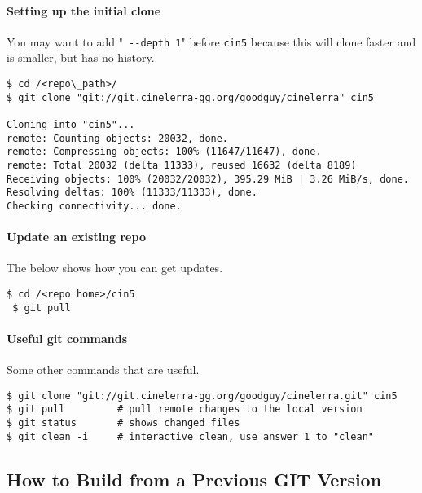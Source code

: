 \paragraph{Setting up the initial clone}%
\label{par:setting_up_the_initial_clone}

You may want to add "\texttt{ -{}-depth 1}" before \texttt{cin5} because this will clone faster and is smaller, but has no history.

\begin{lstlisting}[numbers=none]
$ cd /<repo\_path>/
$ git clone "git://git.cinelerra-gg.org/goodguy/cinelerra" cin5

Cloning into "cin5"...
remote: Counting objects: 20032, done.
remote: Compressing objects: 100% (11647/11647), done.
remote: Total 20032 (delta 11333), reused 16632 (delta 8189)
Receiving objects: 100% (20032/20032), 395.29 MiB | 3.26 MiB/s, done.
Resolving deltas: 100% (11333/11333), done.
Checking connectivity... done.
\end{lstlisting}

\paragraph{Update an existing repo}%
\label{par:update_an_existing_repo}
The below shows how you can get updates.

\begin{lstlisting}[numbers=none]
 $ cd /<repo home>/cin5
 $ git pull
\end{lstlisting}

\paragraph{Useful git commands}%
\label{par:useful_git_commands}
Some other commands that are useful.

\begin{lstlisting}[numbers=none]
$ git clone "git://git.cinelerra-gg.org/goodguy/cinelerra.git" cin5
$ git pull         # pull remote changes to the local version
$ git status       # shows changed files
$ git clean -i     # interactive clean, use answer 1 to "clean"
\end{lstlisting}



\subsection{How to Build from a Previous GIT Version}%
\label{sub:how_to_build_from_a_previous_git_version}


